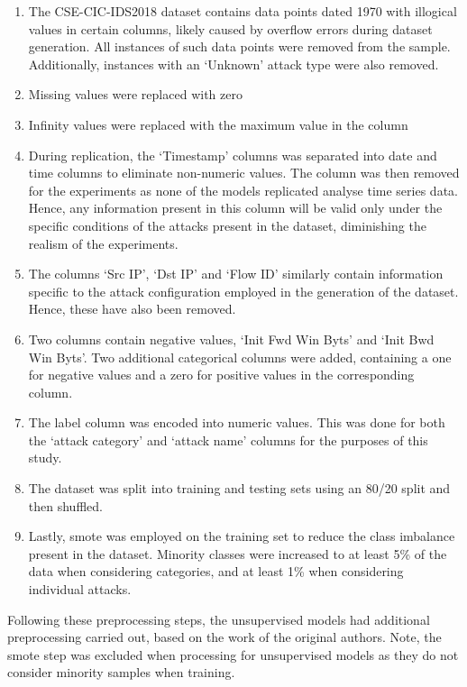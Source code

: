 \begin{enumerate}
      \item The CSE-CIC-IDS2018 dataset contains data points dated 1970 with illogical
            values in certain columns, likely caused by overflow errors during dataset
            generation. All instances of such data points were removed from the sample.
            Additionally, instances with an `Unknown' attack type were also removed.
      \item Missing values were replaced with zero
      \item Infinity values were replaced with the maximum value in the column
      \item During replication, the `Timestamp' columns was separated into date and time
            columns to eliminate non-numeric values. The column was then removed for the
            experiments as none of the models replicated analyse time series data. Hence,
            any information present in this column will be valid only under the specific
            conditions of the attacks present in the dataset, diminishing the realism of
            the experiments.
      \item The columns `Src IP', `Dst IP' and `Flow ID' similarly contain information
            specific to the attack configuration employed in the generation of the dataset.
            Hence, these have also been removed.
      \item Two columns contain negative values, `Init Fwd Win Byts' and `Init Bwd Win
            Byts'. Two additional categorical columns were added, containing a one for
            negative values and a zero for positive values in the corresponding column.
      \item The label column was encoded into numeric values. This was done for both the
            `attack category' and `attack name' columns for the purposes of this study.
      \item The dataset was split into training and testing sets using an 80/20 split and
            then shuffled.
      \item Lastly, \gls{smote} was employed on the training set to reduce the class
            imbalance present in the dataset. Minority classes were increased to at least
            5\% of the data when considering categories, and at least 1\% when considering
            individual attacks.
\end{enumerate}

Following these preprocessing steps, the unsupervised models had additional
preprocessing carried out, based on the work of the original authors. Note, the
\gls{smote} step was excluded when processing for unsupervised models as they
do not consider minority samples when training.

